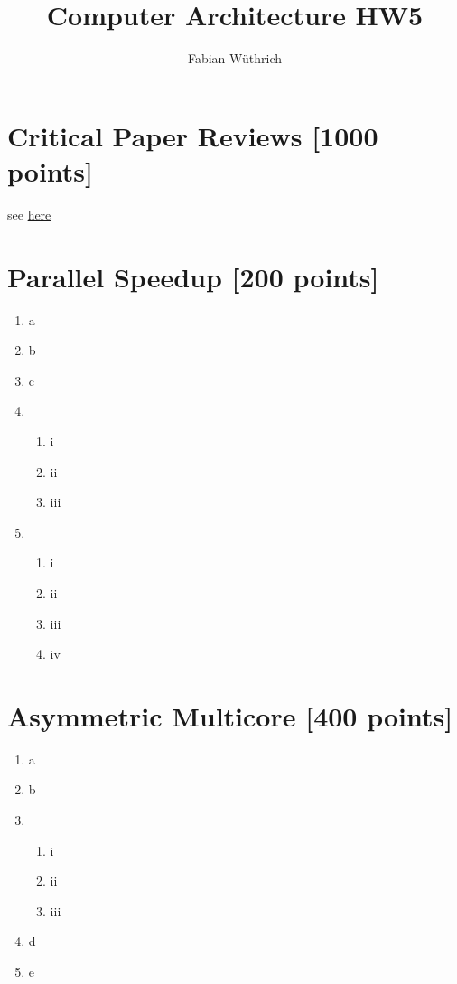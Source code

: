 \documentclass[a4paper]{article}
\title{Computer Architecture HW5}
\author{Fabian Wüthrich}
\begin{document}
\maketitle

\section{Critical Paper Reviews [1000 points]}

see \href{https://safari.ethz.ch/review/architecture20/}{here}

\section{Parallel Speedup [200 points]}

\begin{enumerate}[label=\alph*)]
    \item a
    \item b
    \item c
    \item
        \begin{enumerate}[label=\roman*)]
            \item i
            \item ii
            \item iii
        \end{enumerate}
    \item
        \begin{enumerate}[label=\roman*)]
            \item i
            \item ii
            \item iii
            \item iv
        \end{enumerate}
\end{enumerate}

\section{Asymmetric Multicore [400 points]}

\begin{enumerate}[label=\alph*)]
    \item a
    \item b
    \item
        \begin{enumerate}[label=\roman*)]
            \item i
            \item ii
            \item iii
        \end{enumerate}
    \item d
    \item e
\end{enumerate}
\end{document}
